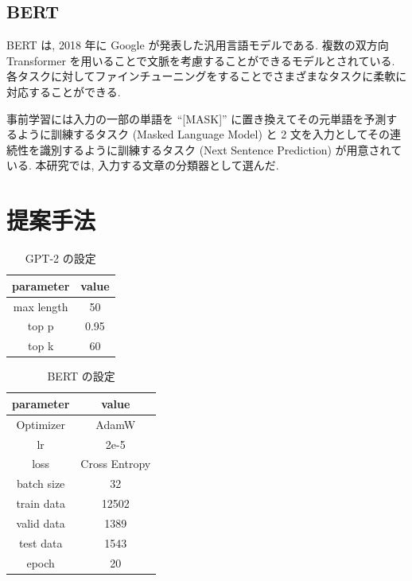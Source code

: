 \documentclass[twocolumn]{jarticle}     %
\begin{document}
\subsection{BERT}
BERT \cite{devlin2018bert} は, 2018 年に Google が発表した汎用言語モデルである.
複数の双方向 Transformer を用いることで文脈を考慮することができるモデルとされている.
各タスクに対してファインチューニングをすることでさまざまなタスクに柔軟に対応することができる.

事前学習には入力の一部の単語を “[MASK]” に置き換えてその元単語を予測するように訓練するタスク (Masked Language Model) と 2 文を入力としてその連続性を識別するように訓練するタスク (Next Sentence Prediction) が用意されている.
本研究では, 入力する文章の分類器として選んだ.


\section{提案手法}

\begin{table}[tb]
  \begin{center}
    \caption{GPT-2 の設定}
    \begin{tabular}{cc}
      \hline
      parameter & value \\
      \hline
      max length & 50 \\
      top p & 0.95 \\
      top k & 60 \\
      \hline
    \end{tabular}
    \label{tab:setting_gpt}
  \end{center}
\end{table}

\begin{table}[tb]
  \begin{center}
    \caption{BERT の設定}
    \begin{tabular}{cc}
      \hline
      parameter & value \\
      \hline
      Optimizer & AdamW \\
      lr & 2e-5 \\
      loss & Cross Entropy \\
      batch size & 32 \\
      train data & 12502 \\
      valid data & 1389 \\
      test data & 1543 \\
      epoch & 20 \\
      \hline
    \end{tabular}
    \label{tab:setting_bert}
  \end{center}
\end{table}
\end{document}
